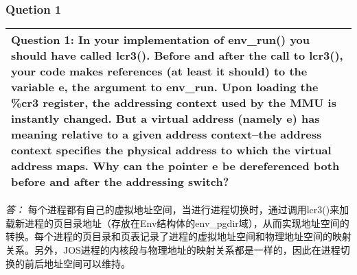 \documentclass[11pt,a4paper]{article}
\newcommand{\exercise}[2]{
\begin{tabular}{|p{\textwidth}|}
\hline
#1: #2\\
\hline
\end{tabular}
\textit{\large{答：}}}
\begin{document}
\subsubsection{Quetion 1}
\exercise{Question 1}{In your implementation of env\_run() you should have called lcr3(). Before and after the call to lcr3(), your code makes references (at least it should) to the variable e, the argument to env\_run. Upon loading the \%cr3 register, the addressing context used by the MMU is instantly changed. But a virtual address (namely e) has meaning relative to a given address context--the address context specifies the physical address to which the virtual address maps. Why can the pointer e be dereferenced both before and after the addressing switch? }
每个进程都有自己的虚拟地址空间，当进行进程切换时，通过调用lcr3()来加载新进程的页目录地址（存放在Env结构体的env\_pgdir域），从而实现地址空间的转换。每个进程的页目录和页表记录了进程的虚拟地址空间和物理地址空间的映射关系。另外，JOS进程的内核段与物理地址的映射关系都是一样的，因此在进程切换的前后地址空间可以维持。
\end{document}
